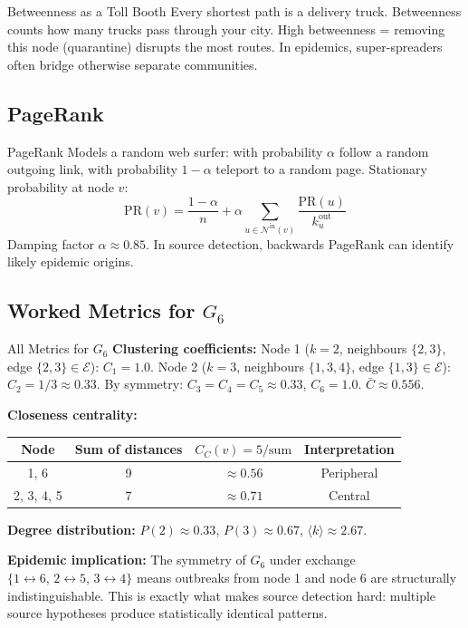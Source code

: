 \begin{analogybox}{Betweenness as a Toll Booth}
Every shortest path is a delivery truck. Betweenness counts how many trucks pass through your city. High betweenness = removing this node (quarantine) disrupts the most routes. In epidemics, super-spreaders often bridge otherwise separate communities.
\end{analogybox}

\subsection{PageRank}

\begin{mathbox}{PageRank}
Models a random web surfer: with probability $\alpha$ follow a random outgoing link, with probability $1-\alpha$ teleport to a random page. Stationary probability at node $v$:
\[
\mathrm{PR}(v) = \frac{1-\alpha}{n} + \alpha \sum_{u \in \mathcal{N}^{\mathrm{in}}(v)} \frac{\mathrm{PR}(u)}{k_u^{\mathrm{out}}}
\]
Damping factor $\alpha \approx 0.85$. In source detection, backwards PageRank can identify likely epidemic origins.
\end{mathbox}

\subsection{Worked Metrics for $G_6$}

\begin{examplebox}{All Metrics for $G_6$}
\textbf{Clustering coefficients:}
Node 1 ($k=2$, neighbours $\{2,3\}$, edge $\{2,3\} \in \mathcal{E}$): $C_1 = 1.0$.
Node 2 ($k=3$, neighbours $\{1,3,4\}$, edge $\{1,3\} \in \mathcal{E}$): $C_2 = 1/3 \approx 0.33$.
By symmetry: $C_3 = C_4 = C_5 \approx 0.33$, $C_6 = 1.0$.
$\bar{C} \approx 0.556$.

\textbf{Closeness centrality:}
\begin{center}
\begin{tabular}{cccc}
\toprule
Node & Sum of distances & $C_C(v) = 5/\text{sum}$ & Interpretation \\
\midrule
1, 6 & 9 & $\approx 0.56$ & Peripheral \\
2, 3, 4, 5 & 7 & $\approx 0.71$ & Central \\
\bottomrule
\end{tabular}
\end{center}

\textbf{Degree distribution:} $P(2) \approx 0.33$, $P(3) \approx 0.67$, $\langle k \rangle \approx 2.67$.

\textbf{Epidemic implication:} The symmetry of $G_6$ under exchange $\{1\!\leftrightarrow\!6,\, 2\!\leftrightarrow\!5,\, 3\!\leftrightarrow\!4\}$ means outbreaks from node 1 and node 6 are structurally indistinguishable. This is exactly what makes source detection hard: multiple source hypotheses produce statistically identical patterns.
\end{examplebox}

